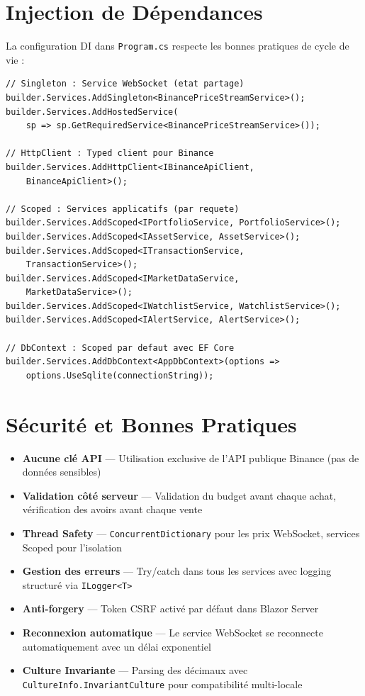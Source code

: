\documentclass[12pt,a4paper]{article}
\begin{document}
\section{Injection de Dépendances}

La configuration DI dans \texttt{Program.cs} respecte les bonnes pratiques de cycle de vie :

\begin{lstlisting}[caption={Configuration de l'injection de dépendances}]
// Singleton : Service WebSocket (etat partage)
builder.Services.AddSingleton<BinancePriceStreamService>();
builder.Services.AddHostedService(
    sp => sp.GetRequiredService<BinancePriceStreamService>());

// HttpClient : Typed client pour Binance
builder.Services.AddHttpClient<IBinanceApiClient,
    BinanceApiClient>();

// Scoped : Services applicatifs (par requete)
builder.Services.AddScoped<IPortfolioService, PortfolioService>();
builder.Services.AddScoped<IAssetService, AssetService>();
builder.Services.AddScoped<ITransactionService,
    TransactionService>();
builder.Services.AddScoped<IMarketDataService,
    MarketDataService>();
builder.Services.AddScoped<IWatchlistService, WatchlistService>();
builder.Services.AddScoped<IAlertService, AlertService>();

// DbContext : Scoped par defaut avec EF Core
builder.Services.AddDbContext<AppDbContext>(options =>
    options.UseSqlite(connectionString));
\end{lstlisting}

\section{Sécurité et Bonnes Pratiques}

\begin{itemize}
    \item \textbf{Aucune clé API} --- Utilisation exclusive de l'API publique Binance (pas de données sensibles)
    \item \textbf{Validation côté serveur} --- Validation du budget avant chaque achat, vérification des avoirs avant chaque vente
    \item \textbf{Thread Safety} --- \texttt{ConcurrentDictionary} pour les prix WebSocket, services Scoped pour l'isolation
    \item \textbf{Gestion des erreurs} --- Try/catch dans tous les services avec logging structuré via \texttt{ILogger<T>}
    \item \textbf{Anti-forgery} --- Token CSRF activé par défaut dans Blazor Server
    \item \textbf{Reconnexion automatique} --- Le service WebSocket se reconnecte automatiquement avec un délai exponentiel
    \item \textbf{Culture Invariante} --- Parsing des décimaux avec \texttt{CultureInfo.InvariantCulture} pour compatibilité multi-locale
\end{itemize}
\end{document}

